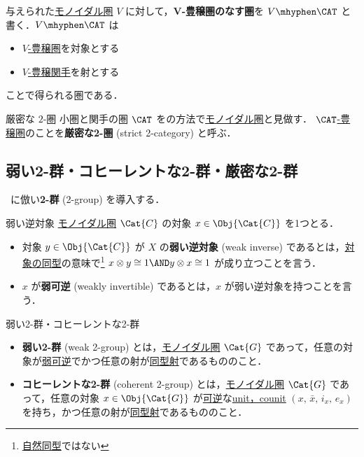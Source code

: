 \documentclass[TQFT_main]{subfiles}
\begin{document}
与えられた\hyperref[redef:monoidal-category]{モノイダル圏} $V$ に対して，\textbf{$\bm{V}$-豊穣圏のなす圏}を $V\mhyphen\CAT$ と書く．$V\mhyphen\CAT$ は
\begin{itemize}
    \item \hyperref[redef:enriched]{$V$-豊穣圏}を対象とする
    \item \hyperref[redef:enriched]{$V$-豊穣関手}を射とする
\end{itemize}
ことで得られる圏である．

\begin{mydef}[label=def:str2cat]{厳密な $2$-圏}
    小圏と関手の圏 $\CAT$ をの方法で\hyperref[redef:monoidal-category]{モノイダル圏}と見做す．
    \hyperref[redef:enriched]{$\CAT$-豊穣圏}のことを\textbf{厳密な2-圏} (strict 2-category) と呼ぶ．
\end{mydef}


\subsection{弱い2-群・コヒーレントな2-群・厳密な2-群}

~\cite{baez2004higherdimensionalalgebrav2groups}に倣い\textbf{2-群} (2-group) を導入する．

\begin{mydef}[label=def:weak-inverse]{弱い逆対象}
    \hyperref[redef:monoidal-category]{モノイダル圏} $\Cat{C}$ の対象 $x \in \Obj{\Cat{C}}$ を1つとる．
    
    \begin{itemize}
        \item 対象 $y \in \Obj{\Cat{C}}$ が $X$ の\textbf{弱い逆対象} (weak inverse) であるとは，\hyperref[def:iso]{対象の同型}の意味で\footnote{\hyperref[nat]{自然同型}ではない} $x \otimes y \cong 1 \AND y \otimes x \cong 1$ が成り立つことを言う．
        \item $x$ が\textbf{弱可逆} (weakly invertible) であるとは，$x$ が弱い逆対象を持つことを言う．
    \end{itemize}
    
\end{mydef}

\begin{mydef}[label=def:W2G-C2G]{弱い2-群・コヒーレントな2-群}
    \begin{itemize}
        \item \textbf{弱い2-群} (weak 2-group) とは，\hyperref[redef:monoidal-category]{モノイダル圏} $\Cat{G}$ であって，任意の対象が\hyperref[def:weak-inverse]{弱可逆}でかつ任意の射が\hyperref[def:iso]{同型射}であるもののこと．
        \item \textbf{コヒーレントな2-群} (coherent 2-group) とは，\hyperref[redef:monoidal-category]{モノイダル圏} $\Cat{G}$ であって，任意の対象 $x \in \Obj{\Cat{G}}$ が\hyperref[def:iso]{可逆}な\hyperref[redef:dual]{unit，counit} $(x,\, \bar{x},\, i_x,\, e_x)$ を持ち，かつ任意の射が\hyperref[def:iso]{同型射}であるもののこと．
    \end{itemize}
\end{mydef}
\end{document}

